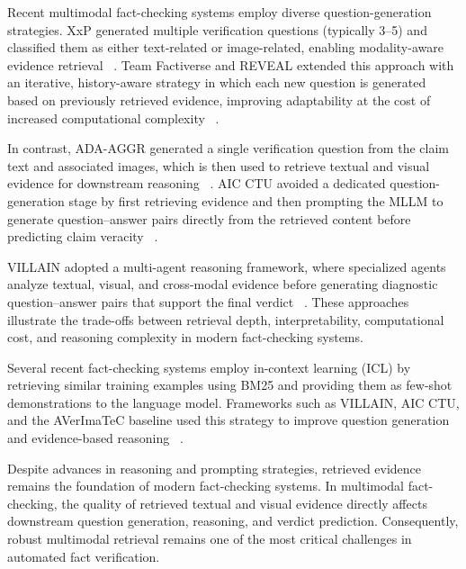 Recent multimodal fact-checking systems employ diverse question-generation strategies. XxP  generated multiple verification questions (typically 3–5) and classified them as either text-related or image-related, enabling modality-aware evidence retrieval ~\cite{Tsoneva2026Mar}. Team Factiverse and REVEAL extended this approach with an iterative, history-aware strategy in which each new question is generated based on previously retrieved evidence, improving adaptability at the cost of increased computational complexity ~\cite{Tariq2026Mar}.

In contrast, ADA-AGGR generated a single verification question from the claim text and associated images, which is then used to retrieve textual and visual evidence for downstream reasoning ~\cite{Upravitelev2026Mar}. AIC CTU avoided a dedicated question-generation stage by first retrieving evidence and then prompting the MLLM to generate question–answer pairs directly from the retrieved content before predicting claim veracity ~\cite{Ullrich2026Mar}.

VILLAIN adopted a multi-agent reasoning framework, where specialized agents analyze textual, visual, and cross-modal evidence before generating diagnostic question–answer pairs that support the final verdict ~\cite{Jung2026Mar}. These approaches illustrate the trade-offs between retrieval depth, interpretability, computational cost, and reasoning complexity in modern fact-checking systems.

Several recent fact-checking systems employ in-context learning (ICL) by retrieving similar training examples using BM25 and providing them as few-shot demonstrations to the language model. Frameworks such as VILLAIN, AIC CTU, and the AVerImaTeC baseline used this strategy to improve question generation and evidence-based reasoning ~\cite{Jung2026Mar,Ullrich2026Mar,Cao2025May}.


Despite advances in reasoning and prompting strategies, retrieved evidence remains the foundation of modern fact-checking systems. In multimodal fact-checking, the quality of retrieved textual and visual evidence directly affects downstream question generation, reasoning, and verdict prediction. Consequently, robust multimodal retrieval remains one of the most critical challenges in automated fact verification.

